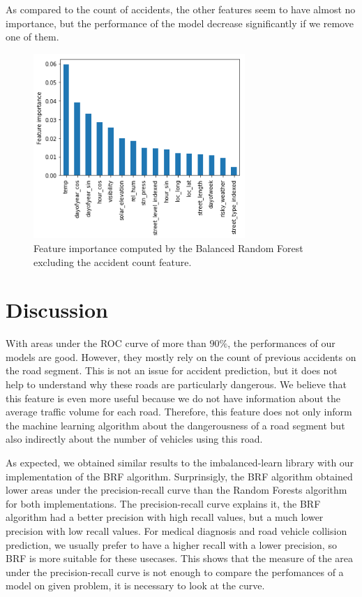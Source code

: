 \documentclass[conference]{IEEEtran}
\begin{document}
As compared to the count of accidents, the other features seem to have almost no
importance, but the performance of the model decrease significantly if we
remove one of them. 

\begin{figure}[htbp]
\centerline{\includegraphics[height=7cm, keepaspectratio]{figures/brf_fi_nocount.png}}
\caption{Feature importance computed by the Balanced Random Forest excluding the accident count feature.}
\label{feature importances}
\end{figure}

\section{Discussion}

With areas under the ROC curve of more than $90\%$, the performances of our models are good.
However, they mostly rely on the count of previous accidents on the road segment. 
This is not an issue for accident prediction, but it does not help to 
understand why these roads are particularly dangerous. We believe that
this feature is even more useful because we do not have information
about the average traffic volume for each road. Therefore, this feature does
not only inform the machine learning algorithm about the dangerousness of a road
segment but also indirectly about the number of vehicles using this road.

As expected, we obtained similar results to the imbalanced-learn library with our implementation of the BRF algorithm. Surprinsigly, the BRF algorithm obtained lower areas under the precision-recall curve than the Random Forests algorithm for both implementations. The precision-recall curve explains it, the BRF algorithm had a better precision with high recall values, but a much lower precision with low recall values. For medical diagnosis and road vehicle collision prediction, we usually prefer to have a higher recall with a lower precision, so BRF is more suitable for these usecases. This shows that the measure of the area under the precision-recall curve is not enough to compare the perfomances of a model on given problem, it is necessary to look at the curve. 
\end{document}
